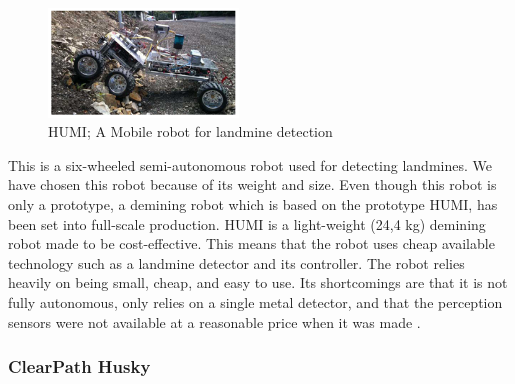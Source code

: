 \begin{figure}
    \centering
      \includegraphics[width=0.45\textwidth]{00 - Images/humi_a_mobile_robot_for_landmine_detection.png}
  \caption{HUMI; A Mobile robot for landmine detection \cite{HUMI2012}}
  \label{fig:humi_a_mobile_robot_for_landmine_detection}
\end{figure}
This is a six-wheeled semi-autonomous robot used for detecting landmines. We have chosen this robot because of its weight and size. Even though this robot is only a prototype, a demining robot which is based on the prototype HUMI, has been set into full-scale production. HUMI is a light-weight (24,4 kg) demining robot made to be cost-effective. This means that the robot uses cheap available technology such as a landmine detector and its controller. The robot relies heavily on being small, cheap, and easy to use. Its shortcomings are that it is not fully autonomous, only relies on a single metal detector, and that the perception sensors were not available at a reasonable price when it was made \cite{HUMI2012}.

\newpage

\subsubsection*{ClearPath Husky}

